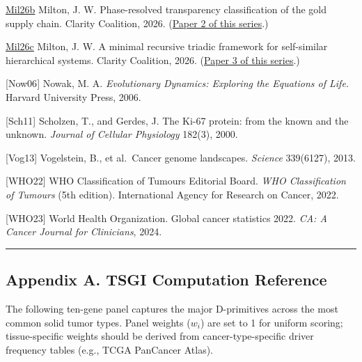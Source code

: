 \documentclass[
  11pt,
  letterpaper,
]{article}
\begin{document}
\href{https://github.com/baardev/truevalue/blob/main/docnav/Research/papers/2_supply-chain-transparency-tvpci/2_supply-chain-transparency-tvpci.pdf}{Mil26b}
Milton, J. W. Phase-resolved transparency classification of the gold
supply chain. Clarity Coalition, 2026.
(\href{https://github.com/baardev/truevalue/blob/main/docnav/Research/papers/2_supply-chain-transparency-tvpci/2_supply-chain-transparency-tvpci.pdf}{Paper
2 of this series}.)

\href{https://github.com/baardev/truevalue/blob/main/docnav/Research/papers/3_minimal-recursive-triadic-framework/3_minimal-recursive-triadic-framework.pdf}{Mil26c}
Milton, J. W. A minimal recursive triadic framework for self-similar
hierarchical systems. Clarity Coalition, 2026.
(\href{https://github.com/baardev/truevalue/blob/main/docnav/Research/papers/3_minimal-recursive-triadic-framework/3_minimal-recursive-triadic-framework.pdf}{Paper
3 of this series}.)

{[}Now06{]} Nowak, M. A. \emph{Evolutionary Dynamics: Exploring the
Equations of Life.} Harvard University Press, 2006.

{[}Sch11{]} Scholzen, T., and Gerdes, J. The Ki-67 protein: from the
known and the unknown. \emph{Journal of Cellular Physiology} 182(3),
2000.

{[}Vog13{]} Vogelstein, B., et al.~Cancer genome landscapes.
\emph{Science} 339(6127), 2013.

{[}WHO22{]} WHO Classification of Tumours Editorial Board. \emph{WHO
Classification of Tumours} (5th edition). International Agency for
Research on Cancer, 2022.

{[}WHO23{]} World Health Organization. Global cancer statistics 2022.
\emph{CA: A Cancer Journal for Clinicians}, 2024.

\begin{center}\rule{0.5\linewidth}{0.5pt}\end{center}

\subsection{Appendix A. TSGI Computation
Reference}\label{appendix-a.-tsgi-computation-reference}

The following ten-gene panel captures the major D-primitives across the
most common solid tumor types. Panel weights (\(w_i\)) are set to 1 for
uniform scoring; tissue-specific weights should be derived from
cancer-type-specific driver frequency tables (e.g., TCGA PanCancer
Atlas).
\end{document}
